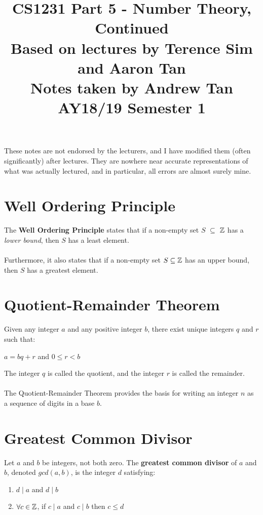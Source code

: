 \documentclass[a4paper]{article}
\title{%
	CS1231 Part 5 - Number Theory, Continued  \\
	\large Based on lectures by Terence Sim and Aaron Tan
	\\ Notes taken by Andrew Tan
	\\ AY18/19 Semester 1
	\\ }
\author{}
\date{\vspace{-5ex}}
\begin{document}
\maketitle

\begin{center}\begin{minipage}[c]{0.9\textwidth}\centering\footnotesize These notes are not endorsed by the lecturers, and I have modified them (often significantly) after lectures. They are nowhere near accurate representations of what was actually lectured, and in particular, all errors are almost surely mine.\end{minipage}\end{center}

\section{Well Ordering Principle}
The \textbf{Well Ordering Principle} states that if a non-empty set $S$ $\subseteq$ $\mathbb{Z}$ has a \textit{lower bound}, then $S$ has a least element.\\\\
Furthermore, it also states that if a non-empty set $S\subseteq\mathbb{Z}$ has an upper bound, then $S$ has a greatest element.

\section{Quotient-Remainder Theorem}
Given any integer $a$ and any positive integer $b$, there exist unique integers $q$ and $r$ such that:
\begin{center}
	$a=bq+r$ and $0\le r < b$
\end{center}
The integer $q$ is called the quotient, and the integer $r$ is called the remainder.\\\\
The Quotient-Remainder Theorem provides the basis for writing an integer $n$ as a sequence of digits in a base $b$.

\section{Greatest Common Divisor}
Let $a$ and $b$ be integers, not both zero. The \textbf{greatest common divisor} of $a$ and $b$, denoted $gcd(a,b)$, is the integer $d$ satisfying:
\begin{enumerate}
	\item $d\mid a$ and $d\mid b$
	\item $\forall c \in \mathbb{Z}$, if $c\mid a$ and $c\mid b$ then $c \le d$
\end{enumerate}
\end{document}

